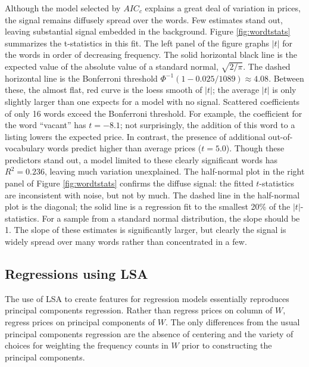 \documentclass[12pt]{article}
\begin{document}
 
 Although the model selected by $AIC_c$ explains a great deal of variation in
 prices, the signal remains diffusely spread over the words.  Few estimates
 stand out, leaving substantial signal embedded in the background.  Figure
 \ref{fig:wordtstats} summarizes the t-statistics in this fit. The left panel of
 the figure graphs $|t|$ for the words in order of decreasing frequency.  The
 solid horizontal black line is the expected value of the absolute value of a
 standard normal, $\sqrt{2/\pi}$. The dashed horizontal line is the Bonferroni
 threshold $\Phi^{-1}(1-0.025/1089) \approx 4.08$.  Between these, the almost
 flat, red curve is the loess smooth of $|t|$; the average $|t|$ is only slightly
 larger than one expects for a model with no signal.  Scattered coefficients of
 only 16 words exceed the Bonferroni threshold.  For example, the coefficient
 for the word ``vacant'' has $t=-8.1$; not surprisingly, the addition of this
 word to a listing lowers the expected price.  In contrast, the presence of
 additional out-of-vocabulary words predict higher than average prices
 ($t=5.0$).  Though these predictors stand out, a model limited to these clearly
 significant words has $R^2 = 0.236$, leaving much variation unexplained.  The
 half-normal plot in the right panel of Figure \ref{fig:wordtstats} confirms the
 diffuse signal: the fitted $t$-statistics are inconsistent with noise, but not
 by much.  The dashed line in the half-normal plot is the diagonal; the solid line
 is a regression fit to the smallest 20\% of the $|t|$-statistics.  For a sample
 from a standard normal distribution, the slope should be 1.  The slope of these
 estimates is significantly larger, but clearly the signal is widely spread over
 many words rather than concentrated in a few.
   

 \subsection{ Regressions using LSA }  %
 \label{sec:regrUsingLSA}
 
 The use of LSA to create features for regression models essentially reproduces
 principal components regression.  Rather than regress prices on column of $W$,
 regress prices on principal components of $W$.  The only differences from the 
 usual principal components regression are the absence of centering and the 
 variety of choices for weighting the frequency counts in $W$ prior
 to constructing the principal components.
 
\end{document}
